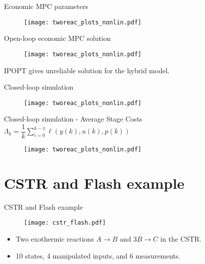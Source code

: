 \documentclass[xcolor=dvipsnames, 8pt]{beamer} %
\begin{document}
\begin{frame}{Economic MPC parameters}
	\begin{figure}
	\centering
	\texttt{[image: tworeac\_plots\_nonlin.pdf]}
	\end{figure}
\end{frame}

\begin{frame}{Open-loop economic MPC solution}
	\vspace{-0.1in}
	\begin{figure}
	\centering
	\texttt{[image: tworeac\_plots\_nonlin.pdf]}
	\end{figure}
	\vspace{-0.2in}
	IPOPT gives unreliable solution for the hybrid model.
\end{frame}

\begin{frame}{Closed-loop simulation}
	\begin{figure}
	\centering
	\texttt{[image: tworeac\_plots\_nonlin.pdf]}
	\end{figure}
\end{frame}

\begin{frame}{Closed-loop simulation - Average Stage Costs}
	\centering
	$\Lambda_k = \dfrac{1}{k}\sum_{i=0}^{k-1} \ell(y(k), u(k), p(k))$
	\vspace{-0.05in}
	\begin{figure}
	\texttt{[image: tworeac\_plots\_nonlin.pdf]}
	\end{figure}
\end{frame}

\section{CSTR and Flash example}

\begin{frame}{CSTR and Flash example}
\begin{figure}
	\texttt{[image: cstr\_flash.pdf]}
\end{figure}
\begin{itemize}
	\item Two exothermic reactions $A \rightarrow B$ and $3B \rightarrow C$
	in the CSTR.
	\item 10 states, 4 manipulated inputs, and 6 measurements.
\end{itemize}
\end{frame}
\end{document}
